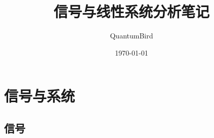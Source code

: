 \documentclass[UTF8]{ctexart}
\title{信号与线性系统分析笔记}
\author{QuantumBird}
\date{\today}
\begin{document}
	\maketitle
	\tableofcontents
	\section{信号与系统}
	\subsection{信号}
	
\end{document}
